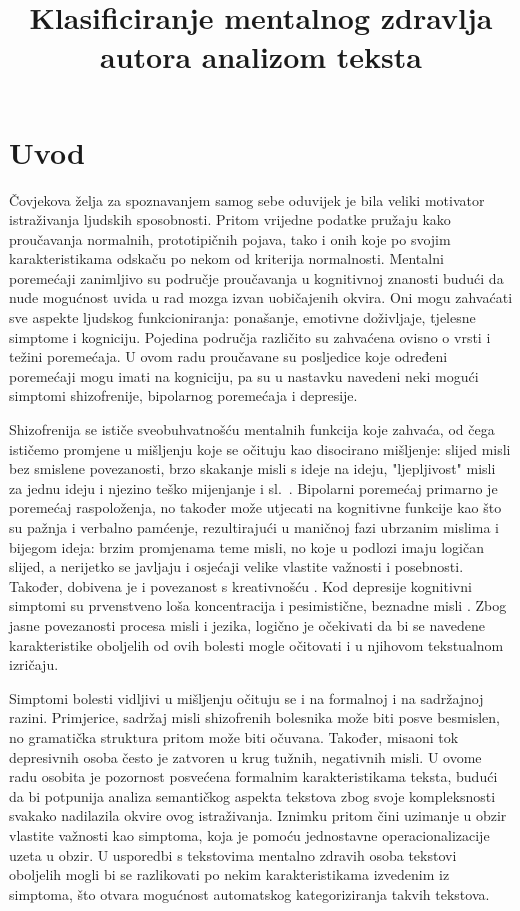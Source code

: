 \documentclass[10pt, a4paper]{article}
\title{Klasificiranje mentalnog zdravlja autora analizom teksta }
\begin{document}
\maketitleabstract

\section{Uvod}

Čovjekova želja za spoznavanjem samog sebe oduvijek je bila veliki motivator istraživanja ljudskih sposobnosti. Pritom vrijedne podatke pružaju kako proučavanja normalnih, prototipičnih pojava, tako i onih koje po svojim karakteristikama odskaču po nekom od kriterija normalnosti. Mentalni poremećaji zanimljivo su područje proučavanja u kognitivnoj znanosti budući da nude mogućnost uvida u rad mozga izvan uobičajenih okvira. Oni mogu zahvaćati sve aspekte ljudskog funkcioniranja: ponašanje, emotivne doživljaje, tjelesne simptome i kogniciju. Pojedina područja različito su zahvaćena ovisno o vrsti i težini poremećaja. U ovom radu proučavane su posljedice koje određeni poremećaji mogu imati na kogniciju, pa su u nastavku navedeni neki mogući simptomi shizofrenije, bipolarnog poremećaja i depresije.

Shizofrenija se ističe sveobuhvatnošću mentalnih funkcija koje zahvaća, od čega ističemo promjene u mišljenju koje se očituju kao disocirano mišljenje: slijed misli bez smislene povezanosti, brzo skakanje misli s ideje na ideju, "ljepljivost" misli za jednu ideju i njezino teško mijenjanje i sl.~\citep{icd}. Bipolarni poremećaj primarno je poremećaj raspoloženja, no također može utjecati na kognitivne funkcije kao što su pažnja i verbalno pamćenje, rezultirajući u maničnoj fazi ubrzanim mislima i bijegom ideja: brzim promjenama teme misli, no koje u podlozi imaju logičan slijed, a nerijetko se javljaju i osjećaji velike vlastite važnosti i posebnosti. Također, dobivena je i povezanost s kreativnošću \citep{crea}. Kod depresije kognitivni simptomi su prvenstveno loša koncentracija i pesimistične, beznadne misli \citep{dsm}. Zbog jasne povezanosti procesa misli i jezika, logično je očekivati da bi se navedene karakteristike oboljelih od ovih bolesti mogle očitovati i u njihovom tekstualnom izričaju. 

Simptomi bolesti vidljivi u mišljenju očituju se i na formalnoj i na sadržajnoj razini. Primjerice, sadržaj misli shizofrenih bolesnika može biti posve besmislen, no gramatička struktura pritom može biti očuvana. Također, misaoni tok depresivnih osoba često je zatvoren u krug tužnih, negativnih misli. U ovome radu osobita je pozornost posvećena formalnim karakteristikama teksta, budući da bi potpunija analiza semantičkog aspekta tekstova zbog svoje kompleksnosti svakako nadilazila okvire ovog istraživanja. Iznimku pritom čini uzimanje u obzir vlastite važnosti kao simptoma, koja je pomoću jednostavne operacionalizacije uzeta u obzir. U usporedbi s tekstovima mentalno zdravih osoba tekstovi oboljelih mogli bi se razlikovati po nekim karakteristikama izvedenim iz simptoma, što otvara mogućnost automatskog kategoriziranja takvih tekstova. 
\end{document}
